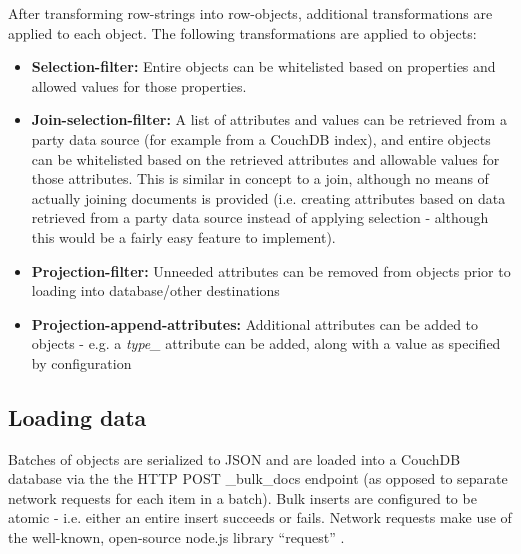 After transforming row-strings into row-objects, additional transformations are applied to each object. The following transformations are applied to objects:

\begin{itemize}
    \item \textbf{Selection-filter:} Entire objects can be whitelisted based on properties and allowed values for those properties.
    \item \textbf{Join-selection-filter:} A list of attributes and values can be retrieved from a  party data source (for example from a CouchDB index), and entire objects can be whitelisted based on the retrieved attributes and allowable values for those attributes. This is similar in concept to a join, although no means of actually joining documents is provided (i.e. creating attributes based on data retrieved from a  party data source instead of applying selection - although this would be a fairly easy feature to implement).
    \item \textbf{Projection-filter:} Unneeded attributes can be removed from objects prior to loading into database/other destinations
    \item \textbf{Projection-append-attributes:} Additional attributes can be added to objects - e.g. a \textit{type\_} attribute can be added, along with a value as specified by configuration
\end{itemize}

\subsection{Loading data}
Batches of objects are serialized to JSON and are loaded into a CouchDB database via the the HTTP POST \_bulk\_docs endpoint (as opposed to separate network requests for each item in a batch). Bulk inserts are configured to be atomic - i.e. either an entire insert succeeds or fails. Network requests make use of the well-known, open-source node.js library ``request'' \cite{request-lib}.